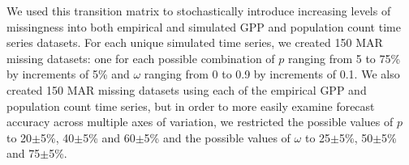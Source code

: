 \documentclass{article}
\begin{document}
\begin{linenumbers}


\noindent We used this transition matrix to stochastically introduce increasing levels of missingness into both empirical and simulated GPP and population count time series datasets. For each unique simulated time series, we created 150 MAR missing datasets: one for each possible combination of $p$ ranging from 5 to 75\% by increments of 5\% and $\omega$ ranging from 0 to 0.9 by increments of 0.1. We also created 150 MAR missing datasets using each of the empirical GPP and population count time series, but in order to more easily examine forecast accuracy across multiple axes of variation, we restricted the possible values of $p$ to 20$\pm$5\%, 40$\pm$5\% and 60$\pm$5\% and the possible values of $\omega$ to 25$\pm$5\%, 50$\pm$5\% and 75$\pm$5\%.



\end{linenumbers}
\end{document}
